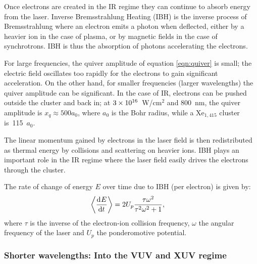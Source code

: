 
Once electrons are created in the IR regime they can continue to absorb energy
from the laser.
Inverse Bremsstrahlung Heating (IBH) is the inverse process of Bremsstrahlung
where an electron emits a photon when deflected, either by a heavier ion in the
case of plasma, or by magnetic fields in the case of synchrotrons. IBH is thus
the absorption of photons accelerating the electrons\cite{Schlessinger1979}.

For large frequencies, the quiver amplitude of equation \eqref{eqn:quiver} is
small; the electric field oscillates
too rapidly for the electrons to gain significant acceleration. On the other
hand, for smaller frequencies (larger wavelengths) the quiver amplitude can
be significant. In the case of IR, electrons can be pushed outside the cluster
and back in; at $\ten{3}{16}$~W/cm$^2$ and 800~nm, the quiver
amplitude is $x_q \approx 500 a_0$, where $a_0$ is the Bohr
radius\cite{Georgescu2007}, while a Xe$_{1,415}$ cluster is~115~$a_0$.

The linear momentum gained by electrons in the laser field is then redistributed
as thermal energy by collisions and scattering on heavier ions.
IBH plays an important role in the IR regime where the laser field easily
drives the electrons through the cluster\cite{Fennel2010}.

The rate of change of energy $E$ over time due to IBH (per electron) is
given\cite{Fennel2010} by:
\begin{align}
\left< \frac{\textrm{d}^{{}} {E}}{\textrm{d} t^{{}}} \right> & = 2 U_p \frac{\tau \omega^2}{\tau^2 \omega^2 + 1},
\end{align}
where $\tau$ is the inverse of the electron-ion collision frequency, $\omega$ the
angular frequency of the laser and $U_p$ the ponderomotive potential.


\subsubsection{Shorter wavelengths: Into the VUV and XUV regime}
\label{section:intro:mechanisms:vuv}

